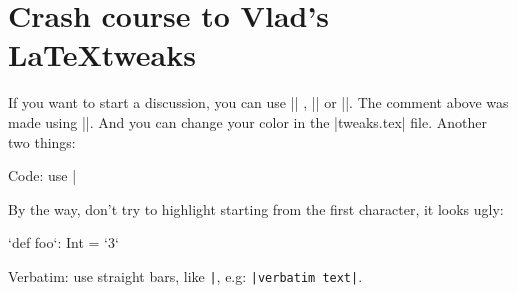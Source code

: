\section*{Crash course to Vlad's \LaTeX tweaks}

 If you want to start a discussion, you can use || , || or ||. The comment above was made using ||. And you can change your color in the |tweaks.tex| file. Another two things:

\vspace{0.5em}

\noindent Code: use |

\noindent By the way, don't try to highlight starting from the first character, it looks ugly:

\begin{lstlisting-nobreak}
  `def foo`: Int = `3`
\end{lstlisting-nobreak}

\noindent Verbatim: use straight bars, like \verb=|=, e.g: \verb=|verbatim text|=.
